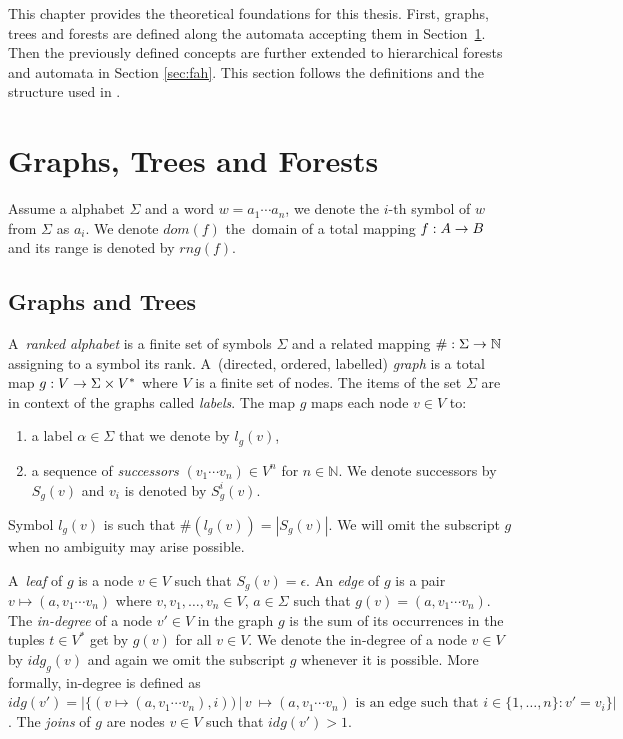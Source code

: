 This chapter provides the theoretical foundations for this thesis.
First, graphs, trees and forests are defined along the automata accepting them in Section~\ref{sec:graph}.
Then the previously defined concepts are further extended to hierarchical forests and automata in Section \ref{sec:fah}.
This section follows the definitions and the structure used in \cite{techrep}.

\section{Graphs, Trees and Forests}
\label{sec:graph}

Assume a alphabet $\Sigma$ and a word $w = a_1 \cdots a_n$, we denote the $i$-th symbol of $w$ from $\Sigma$ as $a_i$.
We denote $dom(f)$ the~domain of a total mapping $f: A \rightarrow B$ and its range is denoted by $rng(f)$.

\subsection{Graphs and Trees}
\label{subsec:graph}
A~\emph{ranked alphabet} is a finite set of symbols $\Sigma$ and a related mapping $\#: \Sigma \rightarrow \mathbb{N}$
assigning to a symbol its rank.
A~(directed, ordered, labelled) \emph{graph} is a total map $g: V \rightarrow \Sigma \times V^{*}$ where $V$ is a finite set of nodes.
The items of the set $\Sigma$ are in context of the graphs called \emph{labels}.
The map $g$ maps each node $v\in V$ to:
\begin{enumerate}
	\item a label $\alpha \in \Sigma$ that we denote by $l_g(v)$,
	\item a sequence of \emph{successors} $(v_1 \cdots v_n) \in V^n$ for $n \in \mathbb{N}$.
		We denote successors by $S_g(v)$ and $v_i$ is denoted by $S^i_g(v)$.
\end{enumerate}
Symbol $l_g(v)$ is such that $\#(l_g(v)) = |S_g(v)|$.
We will omit the subscript $g$ when no ambiguity may arise possible.

A~\emph{leaf} of $g$ is a node $v \in V$ such that $S_g(v) = \epsilon$.
An \emph{edge} of $g$ is a pair $v \mapsto (a, v_1 \cdots v_n)$ where $v, v_1, \ldots, v_n \in V$,
$a \in \Sigma$ such that $g(v) = (a, v_1 \cdots v_n)$.
The \emph{in-degree} of a node $v' \in V$ in the graph $g$ is the sum of
its occurrences in the tuples $t \in V^{*}$ get by $g(v)$ for all $v \in V$.
We denote the in-degree of a node $v \in V$ by $idg_g(v)$ and again
we omit the subscript $g$ whenever it is possible.
More formally, in-degree is defined as
$idg(v') = |\{(v \mapsto (a, v_1 \cdots v_n),i)) \,|\, v~\mapsto (a, v_1 \cdots v_n)
\text{ is an edge such that } i \in \{1,\ldots,n\}: v' = v_i\}|$.
The \emph{joins} of $g$ are nodes $v \in V$ such that $idg(v') > 1$.

